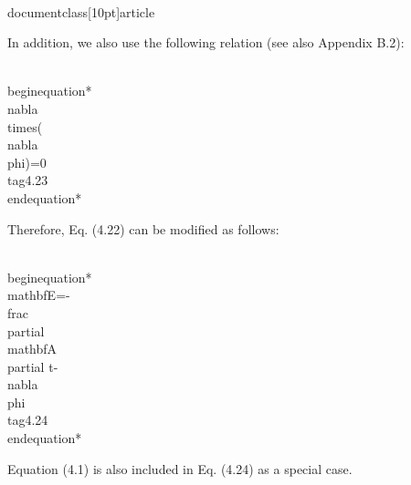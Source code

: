 \\documentclass[10pt]{article}
\begin{document}
In addition, we also use the following relation (see also Appendix B.2):


\\begin{equation*}
\\nabla \\times(\\nabla \\phi)=0 \\tag{4.23}
\\end{equation*}


Therefore, Eq. (4.22) can be modified as follows:


\\begin{equation*}
\\mathbf{E}=-\\frac{\\partial \\mathbf{A}}{\\partial t}-\\nabla \\phi \\tag{4.24}
\\end{equation*}


Equation (4.1) is also included in Eq. (4.24) as a special case.
\end{document}
